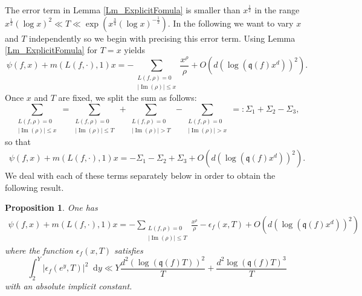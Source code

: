 \documentclass[a4paper,10pt]{amsart}
\theoremstyle{plain}
\newtheorem{prop}[theo]{Proposition}
\theoremstyle{definition}
\begin{document}
The error term in Lemma \ref{Lm_ExplicitFomula} is smaller than $x^{\frac{1}{2}}$ 
in the range $x^{\frac{1}{2}} (\log x)^{2} \ll T \ll \exp\left(x^{\frac{3}{4}}(\log x)^{-\frac{1}{2}}\right)$.
In the following we want to vary $x$ and $T$ independently so we begin with precising this error term.
Using Lemma \ref{Lm_ExplicitFomula} for $T=x$ yields
\begin{equation}\label{Eq_ExplicitFormula_x}
\psi(f,x) + m(L(f,\cdot),1)x  = -\sum_{\substack {L(f,\rho)=0 \\ \lvert\operatorname{Im}(\rho)\rvert\leq x}}\frac{x^{\rho}}{\rho} + 
O\left(d\left(\log(\mathfrak{q}(f)x^{d})\right)^2 \right).
\end{equation}
Once $x$ and $T$ are fixed, we split the sum as follows:
\begin{equation}\label{Eq_splitSum}
\sum_{\substack {L(f,\rho)=0 \\ \lvert\operatorname{Im}(\rho)\rvert\leq x}} = 
	\sum_{\substack {L(f,\rho)=0 \\ \lvert\operatorname{Im}(\rho)\rvert\leq T}} + \sum_{\substack {L(f,\rho)=0 \\ \lvert\operatorname{Im}(\rho)\rvert>T}}
	- \sum_{\substack {L(f,\rho)=0 \\ \lvert\operatorname{Im}(\rho)\rvert> x}}=: \Sigma_{1} + \Sigma_{2} - \Sigma_{3},
\end{equation}
so that
\begin{align*}
\psi(f,x) + m(L(f,\cdot),1)x  = -\Sigma_{1} - \Sigma_{2} + \Sigma_{3} + 
O\left(d\left(\log(\mathfrak{q}(f)x^{d})\right)^2 \right).
\end{align*}
We deal with each of these terms separately below in order to obtain the following result.

\begin{prop}\label{Prop_decomp_psi}
One has 
\begin{align*}
\psi(f,x) + m(L(f,\cdot),1)x  = 
- \sum_{\substack {L(f,\rho)=0 \\ \lvert\operatorname{Im}(\rho)\rvert\leq T}}\frac{x^{\rho}}{\rho} - \epsilon_{f}(x,T) + 
O\left(d\left(\log(\mathfrak{q}(f)x^{d})\right)^2 \right)
\end{align*}
where the function $\epsilon_{f}(x,T)$ satisfies
$$\int_{2}^{Y}\lvert \epsilon_{f}(e^{y},T)\rvert^{2} {\mathop{}\!\mathrm{d}} y \ll Y\frac{d^{2}\left(\log(\mathfrak{q}(f)T)\right)^2}{T} + \frac{d^{2}\log(\mathfrak{q}(f)T)^3}{T}$$
with an absolute implicit constant.
\end{prop}
\end{document}
